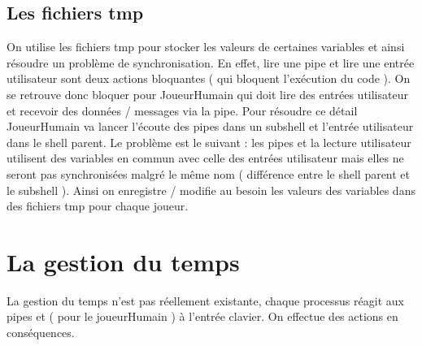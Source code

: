 \documentclass{article}
\begin{document}
\subsection{Les fichiers tmp}
On utilise les fichiers tmp pour stocker les valeurs de certaines variables et ainsi résoudre un problème de synchronisation. En effet, lire une pipe et lire une entrée utilisateur sont deux actions bloquantes ( qui bloquent l'exécution du code ). On se retrouve donc bloquer pour JoueurHumain qui doit lire des entrées utilisateur et recevoir des données / messages via la pipe. Pour résoudre ce détail JoueurHumain va lancer l'écoute des pipes dans un subshell et l'entrée utilisateur dans le shell parent. Le problème est le suivant : les pipes et la lecture utilisateur utilisent des variables en commun avec celle des entrées utilisateur mais elles ne seront pas synchronisées malgré le même nom ( différence entre le shell parent et le subshell ). Ainsi on enregistre / modifie au besoin les valeurs des variables dans des fichiers tmp pour chaque joueur.   

\section{La gestion du temps}

La gestion du temps n'est pas réellement existante, chaque processus réagit aux pipes et ( pour le joueurHumain ) à l'entrée clavier. On effectue des actions en conséquences. 


\end{document}
